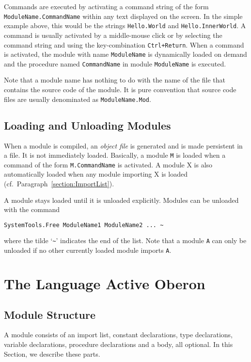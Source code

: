 \documentclass[a4paper,11pt]{article}
\begin{document}
Commands are executed by activating a command string of the form \verb+ModuleName.CommandName+ within any text displayed on the screen. In the simple example above, this would be the strings \verb+Hello.World+ and \verb+Hello.InnerWorld+. A command is usually activated by a middle-mouse click or by selecting the command string and using the key-combination \verb|Ctrl+Return|. When a command is activated, the module with name \verb+ModuleName+ is dynamically loaded on demand and the procedure named \verb+CommandName+ in module \verb+ModuleName+ is executed.

Note that a module name has nothing to do with the name of the file that contains the source code of the module. It is pure convention that source code files are usually denominated as \verb+ModuleName.Mod+.

\subsection{Loading and Unloading Modules}\label{section:LoadingAndUnloadingModules}
When a module is compiled, an {\em object file} is generated and is made persistent in a file. It is not immediately loaded.
Basically, a module \verb+M+ is loaded when a command of the form \verb+M.CommandName+ is activated. A module X is also automatically loaded when any module importing X is loaded (cf.~Paragraph~\ref{section:ImportList}).

A module stays loaded until it is unloaded explicitly. Modules can be unloaded with the command
\begin{center}
\verb+SystemTools.Free ModuleName1 ModuleName2 ... ~+
\end{center}
where the tilde `\verb+~+' indicates the end of the list. Note that a module \verb+A+ can only be unloaded if no other currently loaded module imports \verb+A+.

\section{The Language Active Oberon}\label{section:TheLanguageActiveOberon}

\subsection{Module Structure}
A module consists of an import list, constant declarations, type declarations, variable declarations, procedure declarations and a body, all optional. In this Section, we describe these parts.
\end{document}
